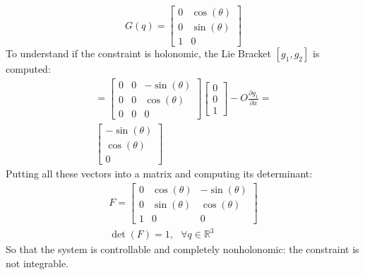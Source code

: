 \begin{equation*}
    G(q)=
    \begin{bmatrix}
        0 & \cos(\theta) \\
        0 & \sin(\theta) \\
        1 & 0
    \end{bmatrix}
\end{equation*}
To understand if the constraint is holonomic, the Lie Bracket $[g_1,g_2]$ is computed:
\begin{gather*}
    [g_1,g_2]
    =
    \begin{bmatrix}
        0 & 0 & -\sin(\theta) \\
        0 & 0 & \cos(\theta) \\
        0 & 0 & 0
    \end{bmatrix}
    \begin{bmatrix}
        0 \\ 0 \\ 1
    \end{bmatrix}
    -
    O\frac{\partial g_1}{\partial x}=\\
    \begin{bmatrix}
        -\sin(\theta) \\
        \cos(\theta) \\
        0
    \end{bmatrix}
\end{gather*}
Putting all these vectors into a matrix and computing its determinant:
\begin{gather*}
    F=
    \begin{bmatrix}
        0 & \cos(\theta) & -\sin(\theta) \\
        0 & \sin(\theta) & \cos(\theta) \\
        1 & 0 & 0
    \end{bmatrix} \\
    \det(F)=1, \textbf{ } \forall q \in \mathbb{R}^3
\end{gather*}
So that the system is controllable and completely nonholonomic: the constraint is not integrable.
